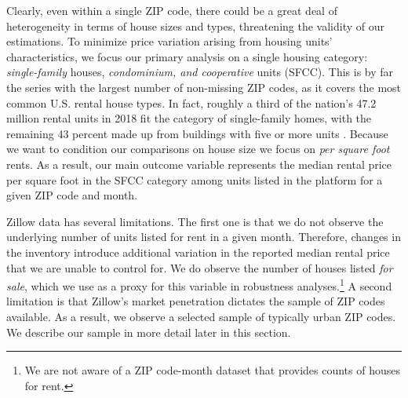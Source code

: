 Clearly, even within a single ZIP code, there could be a great deal of heterogeneity in 
terms of house sizes and types, threatening the validity of our estimations.
To minimize price variation arising from housing units' characteristics, we focus 
our primary analysis on a single housing category: \textit{single-family} houses, 
\textit{condominium, and cooperative} units (SFCC). This is by far the series with the 
largest number of non-missing ZIP codes, as it covers the most common U.S. rental house 
types. In fact, roughly a third of the nation's 47.2 million rental units in 2018 fit the 
category of single-family homes, with the remaining 43 percent made up from buildings with 
five or more units \parencite{fernald2020americas}. Because we want to condition our 
comparisons on house size we focus on \textit{per square foot} rents. As a result, our main 
outcome variable represents the median rental price per square foot in the SFCC category 
among units listed in the platform for a given ZIP code and month. 

Zillow data has several limitations. The first one is that we do not observe the 
underlying number of units listed for rent in a given month. Therefore, changes in the 
inventory introduce additional variation in the reported median rental price that we 
are unable to control for. We do observe the number of houses listed \textit{for sale}, 
which we use as a proxy for this variable in robustness analyses.\footnote{We are not 
	aware of a ZIP code-month dataset that provides counts of houses for rent.}
A second limitation is that Zillow's market penetration dictates the sample of ZIP codes 
available. As a result, we observe a selected sample of typically urban ZIP codes. We 
describe our sample in more detail later in this section.

